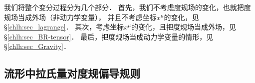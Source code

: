 

我们将整个变分过程分为几个部分．
首先，我们不考虑度规场的变化，也就把度规场当成外场（非动力学变量），
并且不考虑坐标${x^\mu}$的变化，见\S\ref{chlh:sec_lagrange}．
其次，考虑坐标${x^\mu}$的变化，且把度规场当成外场，见\S\ref{chlh:sec_BR-tensor}．
最后，把度规场当成动力学变量的情形，见\S\ref{chlh:sec_Gravity}．





\subsection{流形中拉氏量对度规偏导规则}\label{chlh:sec_rules-DLg}

